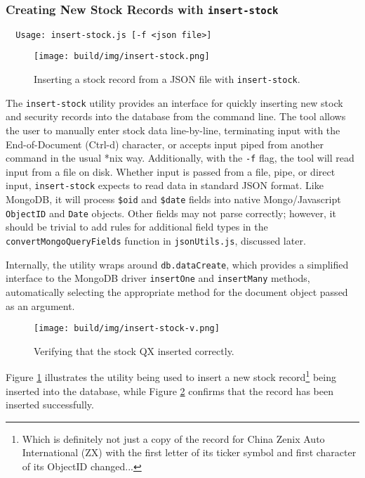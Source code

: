 \documentclass[
11pt,
titlepage,
]{article}
\begin{document}
\subsubsection{Creating New Stock Records with \texttt{insert-stock}}

\begin{lstlisting}
  Usage: insert-stock.js [-f <json file>]
\end{lstlisting}

\begin{figure}[tp]
  \texttt{[image: build/img/insert-stock.png]}
  \caption{Inserting a stock record from a JSON file with
    \texttt{insert-stock}.}
  \label{fig:insert-stock}
\end{figure}

The \texttt{insert-stock} utility provides an interface for quickly inserting
new stock and security records into the database from the command line. The tool
allows the user to manually enter stock data line-by-line, terminating input
with the End-of-Document (Ctrl-d) character, or accepts input piped from another
command in the usual *nix way. Additionally, with the \texttt{-f} flag, the tool
will read input from a file on disk. Whether input is passed from a file, pipe,
or direct input, \texttt{insert-stock} expects to read data in standard JSON
format. Like MongoDB, it will process \texttt{\$oid} and \texttt{\$date} fields
into native Mongo/Javascript \texttt{ObjectID} and \texttt{Date} objects. Other
fields may not parse correctly; however, it should be trivial to add rules for
additional field types in the \texttt{convertMongoQueryFields} function in
\texttt{jsonUtils.js}, discussed later.

Internally, the utility wraps around \texttt{db.dataCreate}, which provides
a simplified interface to the MongoDB driver \texttt{insertOne} and
\texttt{insertMany} methods, automatically selecting the appropriate method
for the document object passed as an argument.

\begin{figure}[bp]
  \texttt{[image: build/img/insert-stock-v.png]}
  \caption{Verifying that the stock QX inserted correctly.}
  \label{fig:insert-stock-v}
\end{figure}

Figure \ref{fig:insert-stock} illustrates the utility being used to insert a new
stock record\footnote{Which is definitely not just a copy of the record for
China Zenix Auto International (ZX) with the first letter of its ticker symbol
and first character of its ObjectID changed...} being inserted into the
database, while Figure \ref{fig:insert-stock-v} confirms that the record has
been inserted successfully.
\end{document}

